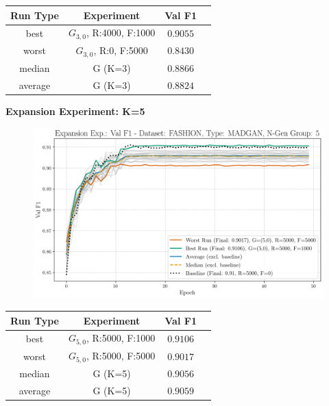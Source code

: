 \begin{table}[H]
	\vspace{-1em}
	\centering
	\begin{tabular}{|c|c|c|c|}
		\hline
		Run Type & Experiment & Val F1 \\ \hline
		best & \(G_{3, 0}\), R:4000, F:1000 & $0.9055$\\ \hline
		worst & \(G_{3, 0}\), R:0, F:5000 & $0.8430$\\ \hline
		median & G (K=3) & $0.8866$\\ \hline
		average & G (K=3) & $0.8824$
		\\ \hline
	\end{tabular}
\end{table}
\newpage
\noindent\textbf{Expansion Experiment: K=5}
\begin{figure}[htbp]
	\centering
	\includegraphics[width=.85\textwidth]{abb/strat_classifier_performance/FASHION_STRATIFIED_CLASSIFIERS_MADGAN_NEW/expansion_experiments/val_f1_score_MADGAN_FASHION_n_gen_5_all.png}
	\label{fig:app_strat_class_performance_expansion_exp._val_f1_score_5}
\end{figure}
\begin{table}[H]
	\vspace{-1em}
	\centering
	\begin{tabular}{|c|c|c|c|}
		\hline
		Run Type & Experiment & Val F1 \\ \hline
		best & \(G_{5, 0}\), R:5000, F:1000 & $0.9106$\\ \hline
		worst & \(G_{5, 0}\), R:5000, F:5000 & $0.9017$\\ \hline
		median & G (K=5) & $0.9056$\\ \hline
		average & G (K=5) & $0.9059$
		\\ \hline
	\end{tabular}
\end{table}
